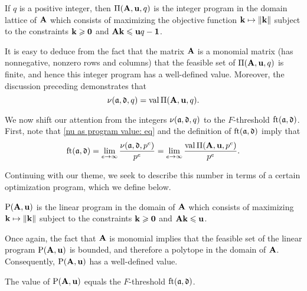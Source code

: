 \documentclass{amsart}
\begin{document}
\begin{definition}
\label{IP: D}
   If $q$ is a positive integer, then $\Pi(\mathbf{A}, \mathbf{u}, q)$ is the integer program in the domain lattice of $\mathbf{A}$ which consists of maximizing the objective function $\mathbf{k} \mapsto \| \mathbf{k} \|$ subject to the constraints $\mathbf{k} \geqslant \mathbf{0}$ and $\mathbf{A} \mathbf{k} \leqslant \mathbf{u}q - \mathbf{1}$.
\end{definition}

It is easy to deduce from the fact that the matrix $\mathbf{A}$ is a monomial matrix (\ie has nonnegative, nonzero rows and columns) that the feasible set of $\Pi(\mathbf{A},\mathbf{u},q)$ is finite, and hence this integer program has a well-defined value.
Moreover, the discussion preceding  demonstrates that
\begin{equation}
\label{nu as program value: eq}
\nu(\mathfrak{a},\mathfrak{d},q) = \operatorname{val} \Pi(\mathbf{A},\mathbf{u},q).
\end{equation}

We now shift our attention from the integers $\nu(\mathfrak{a}, \mathfrak{d}, q)$ to the $F$-threshold $\operatorname{ft}(\mathfrak{a}, \mathfrak{d})$.  First, note that \eqref{nu as program value: eq} and the definition of $\operatorname{ft}(\mathfrak{a}, \mathfrak{d})$ imply that
\begin{equation}
\label{ft as limit of normalized program values: eq}
\operatorname{ft}(\mathfrak{a}, \mathfrak{d}) = \lim_{e\to\infty} \frac{\nu(\mathfrak{a},\mathfrak{d},p^e)}{p^e} = \lim_{e\to\infty} \frac{\operatorname{val} \Pi(\mathbf{A},\mathbf{u},p^e)}{p^e}.
\end{equation}

Continuing with our theme, we seek to describe this number in terms of a certain optimization program, which we define below.

\begin{definition}
\label{LP: D}
 $\mathrm{P}(\mathbf{A}, \mathbf{u})$ is the linear program in the domain of $\mathbf{A}$ which consists of maximizing $\mathbf{k} \mapsto \| \mathbf{k} \|$ subject to the constraints $\mathbf{k} \geqslant \mathbf{0}$ and $\mathbf{A} \mathbf{k} \leqslant \mathbf{u}$.
\end{definition}

Once again, the fact that $\mathbf{A}$ is monomial implies that the feasible set of the linear program $\mathrm{P}(\mathbf{A},\mathbf{u})$ is bounded, and therefore a polytope in the domain of $\mathbf{A}$.  Consequently, $\mathrm{P}(\mathbf{A},\mathbf{u})$ has a well-defined value.

\begin{proposition}
\label{ft as val LP: P}
The value of $\mathrm{P}(\mathbf{A}, \mathbf{u})$ equals the $F$-threshold $\operatorname{ft}(\mathfrak{a}, \mathfrak{d})$.
\end{proposition}
\end{document}
